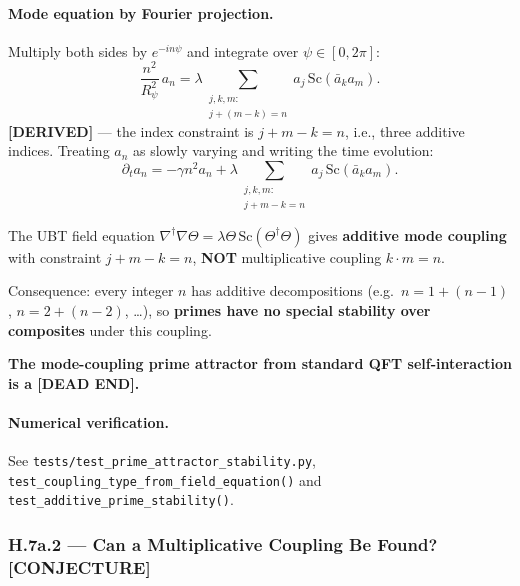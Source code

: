 \paragraph{Mode equation by Fourier projection.}
Multiply both sides by $e^{-in\psi}$ and integrate over $\psi \in [0,2\pi]$:
\begin{equation}
  \frac{n^2}{R_\psi^2}\,a_n = \lambda\sum_{\substack{j,k,m:\\ j+(m-k)=n}} a_j\,\mathrm{Sc}(\bar{a}_k a_m).
  \label{eq:mode-eq-additive}
\end{equation}
\textbf{[DERIVED]} — the index constraint is $j + m - k = n$, i.e., three additive
indices.  Treating $a_n$ as slowly varying and writing the time evolution:
\begin{equation}
  \partial_t a_n = -\gamma n^2 a_n
    + \lambda\!\!\sum_{\substack{j,k,m:\\ j+m-k=n}}\!\! a_j\,\mathrm{Sc}(\bar{a}_k a_m).
  \label{eq:mode-ODE-additive}
\end{equation}

\begin{tcolorbox}[colback=red!5!white,colframe=red!60!black,
  title=\textbf{Key Result — Additive Coupling} \textmd{[DERIVED]}]
The UBT field equation $\nabla^\dagger\nabla\Theta = \lambda\Theta\,\mathrm{Sc}(\Theta^\dagger\Theta)$
gives \textbf{additive mode coupling} with constraint $j + m - k = n$, \textbf{NOT}
multiplicative coupling $k \cdot m = n$.

Consequence: every integer $n$ has additive decompositions
(e.g.\ $n = 1 + (n-1)$, $n = 2 + (n-2)$, \ldots), so \textbf{primes have no special
stability over composites} under this coupling.

\textbf{The mode-coupling prime attractor from standard QFT self-interaction is a
[DEAD END].}
\end{tcolorbox}

\paragraph{Numerical verification.}
See \texttt{tests/test\_prime\_attractor\_stability.py},
\texttt{test\_coupling\_type\_from\_field\_equation()} and
\texttt{test\_additive\_prime\_stability()}.

\subsubsection*{H.7a.2 — Can a Multiplicative Coupling Be Found?  \textbf{[CONJECTURE]}}

